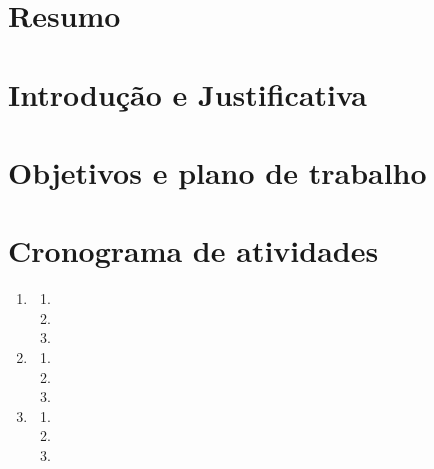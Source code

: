 \documentclass[
	article,
	12pt,				%
	openright,			%
	oneside,			%
	a4paper,			%
	english,			%
	french,				%
	spanish,			%
	brazil,				%
	]{abntex2}
\begin{document}

\frenchspacing 


\imprimirfolhaderosto

\tableofcontents*

\textual
\setcounter{page}{1}
\section{Resumo}
  
\section{Introdução e Justificativa}

\section{Objetivos e plano de trabalho}

\section{Cronograma de atividades}

\begin{enumerate}

\item{} 
	\begin{enumerate}
	\item{} 
	\item{} 
	\item{} 
	\end{enumerate}
\item{} 
	\begin{enumerate}
	\item{} 
	\item{} 
	\item{} 
	\end{enumerate}
\item{} 
	\begin{enumerate}
	\item{} 
	\item{} 
	\item{} 
	\end{enumerate}
\end{enumerate}
\end{document}
